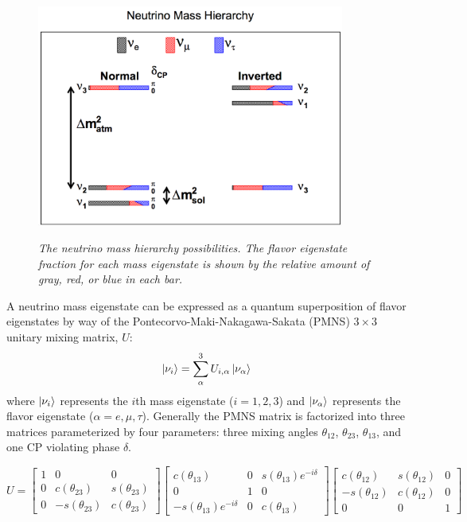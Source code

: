 \begin{figure}[ht!]
\centering
	\includegraphics[width=0.9\textwidth]{Figures/nu_hierarchy_fig.png} \\
\caption{\textit{The neutrino mass hierarchy possibilities. The flavor eigenstate fraction for each mass eigenstate is shown by the relative amount of gray, red, or blue in each bar.}}\label{nu_hierarchy_fig}
\end{figure}

A neutrino mass eigenstate can be expressed as a quantum superposition of flavor eigenstates by way of the Pontecorvo-Maki-Nakagawa-Sakata (PMNS) $3\times3$ unitary mixing matrix, $U$:
\begin{equation}\label{nuPMNSmixeqtn}
\Ket{\nu_i} = \sum_\alpha^3 U_{i,\alpha}\Ket{\nu_\alpha}
\end{equation}
where $\Ket{\nu_i}$ represents the $i$th mass eigenstate ($i=1,2,3$) and $\Ket{\nu_\alpha}$ represents the flavor eigenstate ($\alpha=e,\mu,\tau$). Generally the PMNS matrix is factorized into three matrices parameterized by four parameters: three mixing angles $\theta_{12}$, $\theta_{23}$, $\theta_{13}$, and one CP violating phase $\delta$.

\begin{equation}\label{PMNSfactorized}
U = \begin{bmatrix} 1 & 0 & 0 \\ 0 & c(\theta_{23}) & s(\theta_{23}) \\ 0 & -s(\theta_{23}) & c(\theta_{23}) \end{bmatrix} 
\begin{bmatrix} c(\theta_{13}) & 0 & s(\theta_{13})e^{-i\delta} \\ 0 & 1 & 0 \\ -s(\theta_{13})e^{-i\delta} & 0 & c(\theta_{13}) \end{bmatrix} 
\begin{bmatrix} c(\theta_{12}) & s(\theta_{12}) & 0 \\ -s(\theta_{12}) & c(\theta_{12}) & 0 \\ 0 & 0 & 1 \end{bmatrix} 
\end{equation}

